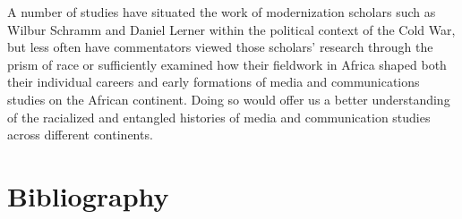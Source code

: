 \documentclass{tufte-handout}
\begin{document}
A number of studies have situated the work of modernization scholars
such as Wilbur Schramm and Daniel Lerner within the political context of
the Cold War, but less often have commentators viewed those scholars'
research through the prism of race or sufficiently examined how their
fieldwork in Africa shaped both their individual careers and early
formations of media and communications studies on the African continent.
Doing so would offer us a better understanding of the racialized and
entangled histories of media and communication studies across different
continents.







\section{Bibliography}\label{bibliography}
\end{document}
